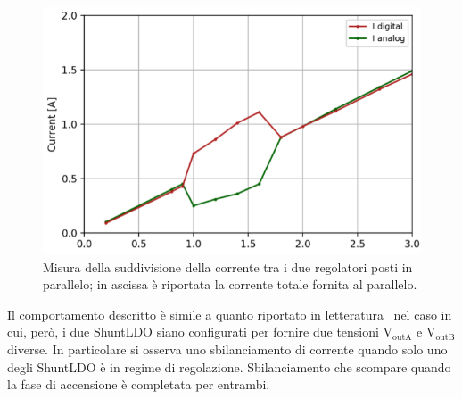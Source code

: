 % 
%

\begin{figure}
\centering
\includegraphics[scale=.4]{Immagini/CurrentSharing}
\caption{Misura della suddivisione della corrente tra i due regolatori posti in parallelo; in ascissa è riportata la corrente totale fornita al parallelo.}%
\label{CurrentSharing}
\end{figure}
Il comportamento descritto è simile a quanto riportato in letteratura~\cite{SLDO} nel caso in cui, per\`o, i due ShuntLDO siano configurati per fornire due tensioni $\mathrm{V_{outA}}$ e $\mathrm{V_{outB}}$ diverse. In particolare si osserva uno sbilanciamento di corrente quando solo uno degli ShuntLDO \`e in regime di regolazione. Sbilanciamento che scompare quando la fase di accensione \`e completata per entrambi.
 


